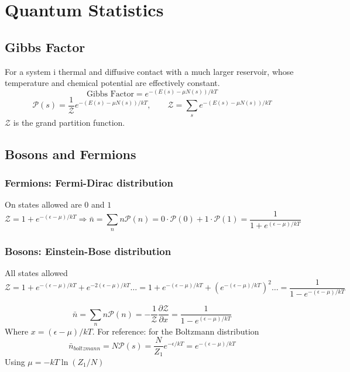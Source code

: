 \documentclass[a4paper,norsk, 10pt]{article}
\begin{document}
\section{Quantum Statistics}
\subsection{Gibbs Factor}
For a system i thermal and diffusive contact with a much larger reservoir, whose temperature and chemical potential are effectively constant.
\begin{equation}
\text{Gibbs Factor} = e^{-(E(s) - \mu N(s))/kT}
\end{equation}
\begin{equation}
\mathcal{P}(s) = \frac{1}{\mathcal{Z}}e^{-(E(s) - \mu N(s))/kT}, \qquad \mathcal{Z} = \sum_s e^{-(E(s) - \mu N(s))/kT}
\end{equation}
$\mathcal{Z}$ is the grand partition function.
\subsection{Bosons and Fermions}
\subsubsection{Fermions:  Fermi-Dirac distribution}
On states allowed are $0$ and $1$
\begin{equation}
\mathcal{Z} = 1 + e^{-(\epsilon - \mu)/kT} \Rightarrow \bar{n} = \sum_n n \mathcal{P}(n) = 0\cdot\mathcal{P}(0) + 1\cdot\mathcal{P}(1) = \frac{1}{1 + e^{(\epsilon - \mu)/kT}}
\end{equation}
\subsubsection{Bosons: Einstein-Bose distribution}
All states allowed
\begin{equation}
\mathcal{Z} = 1 + e^{-(\epsilon - \mu)/kT} + e^{-2(\epsilon - \mu)/kT}\ldots = 1 + e^{-(\epsilon - \mu)/kT} + \left( e^{-(\epsilon - \mu)/kT}\right)^2\ldots =\frac{1}{1 - e^{-(\epsilon - \mu)/kT}}
\end{equation}

\begin{equation}
\bar{n} = \sum_n n \mathcal{P}(n) = -\frac{1}{\mathcal{Z}}\frac{\partial \mathcal{Z}}{\partial x} = \frac{1}{1-e^{(\epsilon - \mu)/kT}}
\end{equation}
Where $x = (\epsilon - \mu)/kT$. For reference: for the Boltzmann distribution
\begin{equation}
\bar{n}_{boltzmann} = N\mathcal{P}(s) = \frac{N}{Z_1}e^{-\epsilon/kT} = e^{-(\epsilon-\mu)/kT}
\end{equation}
Using $\mu = -kT\ln (Z_1/N)$
\end{document}
